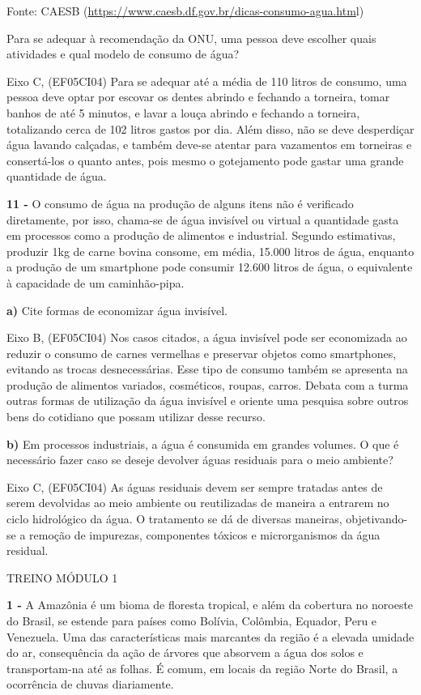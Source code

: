 Fonte: CAESB
(\href{https://www.caesb.df.gov.br/dicas-consumo-agua.html}{https://www.caesb.df.gov.br/dicas-consumo-agua.htm}l)

Para se adequar à recomendação da ONU, uma pessoa deve escolher quais
atividades e qual modelo de consumo de água?

Eixo C, (EF05CI04) Para se adequar até a média de 110 litros de consumo,
uma pessoa deve optar por escovar os dentes abrindo e fechando a
torneira, tomar banhos de até 5 minutos, e lavar a louça abrindo e
fechando a torneira, totalizando cerca de 102 litros gastos por dia.
Além disso, não se deve desperdiçar água lavando calçadas, e também
deve-se atentar para vazamentos em torneiras e consertá-los o quanto
antes, pois mesmo o gotejamento pode gastar uma grande quantidade de
água.

\textbf{11 -} O consumo de água na produção de alguns itens não é
verificado diretamente, por isso, chama-se de água invisível ou virtual
a quantidade gasta em processos como a produção de alimentos e
industrial. Segundo estimativas, produzir 1kg de carne bovina consome,
em média, 15.000 litros de água, enquanto a produção de um smartphone
pode consumir 12.600 litros de água, o equivalente à capacidade de um
caminhão-pipa.

\textbf{a)} Cite formas de economizar água invisível.

Eixo B, (EF05CI04) Nos casos citados, a água invisível pode ser
economizada ao reduzir o consumo de carnes vermelhas e preservar objetos
como smartphones, evitando as trocas desnecessárias. Esse tipo de
consumo também se apresenta na produção de alimentos variados,
cosméticos, roupas, carros. Debata com a turma outras formas de
utilização da água invisível e oriente uma pesquisa sobre outros bens do
cotidiano que possam utilizar desse recurso.

\textbf{b)} Em processos industriais, a água é consumida em grandes
volumes. O que é necessário fazer caso se deseje devolver águas
residuais para o meio ambiente?

Eixo C, (EF05CI04) As águas residuais devem ser sempre tratadas antes de
serem devolvidas ao meio ambiente ou reutilizadas de maneira a entrarem
no ciclo hidrológico da água. O tratamento se dá de diversas maneiras,
objetivando-se a remoção de impurezas, componentes tóxicos e
microrganismos da água residual.

\protect\hypertarget{_t4q5f2sjdf09}{}{}TREINO MÓDULO 1

\textbf{1 -} A Amazônia é um bioma de floresta tropical, e além da
cobertura no noroeste do Brasil, se estende para países como Bolívia,
Colômbia, Equador, Peru e Venezuela. Uma das características mais
marcantes da região é a elevada umidade do ar, consequência da ação de
árvores que absorvem a água dos solos e transportam-na até as folhas. É
comum, em locais da região Norte do Brasil, a ocorrência de chuvas
diariamente.

